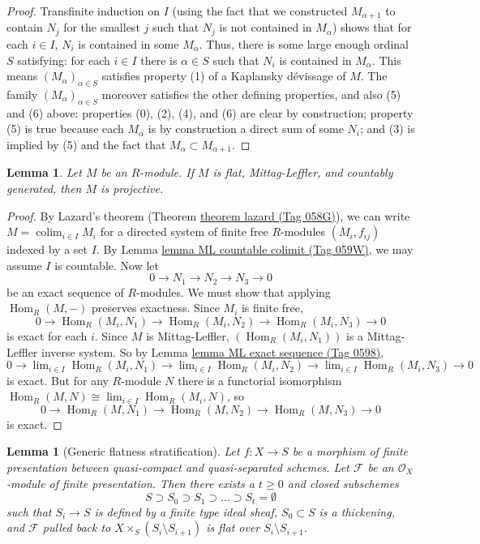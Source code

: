 \documentclass{amsart}
\theoremstyle{plain}
\newtheorem{lemma}[subsection]{Lemma}
\theoremstyle{definition}
\theoremstyle{remark}
\numberwithin{equation}{subsection}
\def\lim{\mathop{\mathrm{lim}}\nolimits}
\def\colim{\mathop{\mathrm{colim}}\nolimits}
\def\Hom{\mathop{\mathrm{Hom}}\nolimits}
\begin{document}
\begin{proof}
\medskip\noindent
Transfinite induction on $I$ (using the fact that we constructed
$M_{\alpha + 1}$
to contain $N_j$ for the smallest $j$ such that $N_j$ is not contained in
$M_{\alpha}$) shows that for each $i \in I$, $N_i$ is contained in some
$M_{\alpha}$.  Thus, there is some large enough ordinal $S$ satisfying: for
each $i \in I$ there is $\alpha \in S$ such that $N_i$ is contained in
$M_{\alpha}$.  This means $(M_{\alpha})_{\alpha \in S}$ satisfies property (1)
of a Kaplansky d\'evissage of $M$.  The family $(M_{\alpha})_{\alpha \in S}$
moreover satisfies the other defining properties, and also (5) and (6) above:
properties (0), (2), (4), and (6) are clear by construction;  property (5) is
true because each $M_{\alpha}$ is by construction a direct sum of some $N_i$;
and (3) is implied by (5) and the fact that $M_{\alpha} \subset M_{\alpha + 1}$.
\end{proof}


\begin{lemma}
\label{algebra-lemma-countgen-projective}
Let $M$ be an $R$-module.  If $M$ is flat, Mittag-Leffler, and countably
generated, then $M$ is projective.
\end{lemma}

\begin{proof}
By Lazard's theorem (Theorem \href{https://stacks.math.columbia.edu/tag/058G}{theorem lazard (Tag 058G)}), we can write $M =
\colim_{i
\in I} M_i$ for a directed system of finite free $R$-modules $(M_i, f_{ij})$
indexed by a set $I$.  By Lemma \href{https://stacks.math.columbia.edu/tag/059W}{lemma ML countable colimit (Tag 059W)}, we may assume
$I$ is countable.  Now let
$$
0 \to N_1 \to N_2 \to N_3 \to 0
$$
be an exact sequence of $R$-modules.  We must show that applying
$\Hom_R(M, -)$
preserves exactness.  Since $M_i$ is finite free,
$$
0 \to \Hom_R(M_i, N_1) \to \Hom_R(M_i, N_2) \to
\Hom_R(M_i, N_3) \to 0
$$
is exact for each $i$.  Since $M$ is Mittag-Leffler, $(\Hom_R(M_i,
N_{1}))$ is
a Mittag-Leffler inverse system.  So by Lemma \href{https://stacks.math.columbia.edu/tag/0598}{lemma ML exact sequence (Tag 0598)},
$$
0 \to \lim_{i \in I} \Hom_R(M_i, N_1) \to
\lim_{i \in I} \Hom_R(M_i, N_2) \to
\lim_{i \in I} \Hom_R(M_i, N_3) \to 0
$$
is exact.  But for any $R$-module $N$ there is a functorial isomorphism
$\Hom_R(M, N) \cong \lim_{i \in I} \Hom_R(M_i, N)$, so
$$
0 \to \Hom_R(M, N_1) \to \Hom_R(M, N_2) \to
\Hom_R(M, N_3) \to 0
$$
is exact.
\end{proof}


\begin{lemma}[Generic flatness stratification]
\label{more-morphisms-lemma-generic-flatness-stratification}
Let $f : X \to S$ be a morphism of finite presentation between quasi-compact
and quasi-separated schemes. Let $\mathcal{F}$ be an $\mathcal{O}_X$-module
of finite presentation. Then there exists a $t \geq 0$ and closed
subschemes
$$
S \supset S_0 \supset S_1 \supset \ldots \supset S_t = \emptyset
$$
such that $S_i \to S$ is defined by a finite type ideal sheaf,
$S_0 \subset S$ is a thickening, and $\mathcal{F}$ pulled back to
$X \times_S (S_i \setminus S_{i + 1})$ is flat over $S_i \setminus S_{i + 1}$.
\end{lemma}
\end{document}
